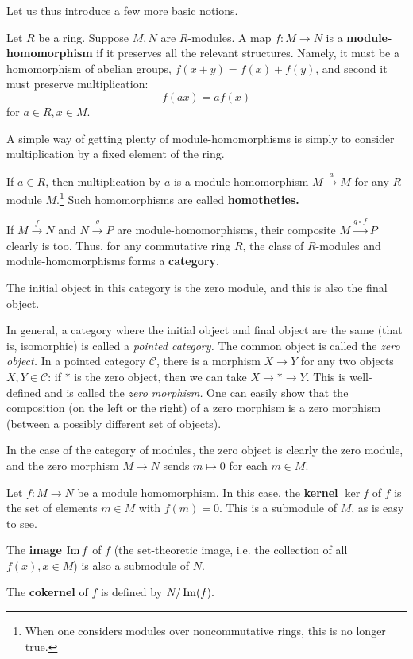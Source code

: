 Let us thus  introduce a  few more basic notions.

\begin{definition} 
Let $R$ be a ring.  Suppose $M,N$ are $R$-modules.  A map $f: M \to N$
is a \textbf{module-homomorphism} if it preserves all the relevant structures.
Namely, it must be a homomorphism of abelian groups, $f(x+y) = f(x) + f(y)$,
and second it must
preserve multiplication:
$$f(ax)  = af(x)$$ for $a \in R, x \in M$. 
\end{definition}

A simple way of getting plenty of module-homomorphisms is simply to consider
multiplication by a fixed element of the ring. 
\begin{example} 
If $a \in R$, then multiplication by $a$ is a module-homomorphism $M
\stackrel{a}{\to} M$ for any $R$-module $M$.\footnote{When one considers
modules over noncommutative rings, this is no longer true.} Such homomorphisms
are called \textbf{homotheties.}
\end{example} 


If $M \stackrel{f}{\to} N$ and $N \stackrel{g}{\to} P$ are
module-homomorphisms, their composite $M \stackrel{g \circ f}{\to} P$ clearly
is too. 
Thus, for any commutative ring $R$, the class of $R$-modules and
module-homomorphisms forms a \textbf{category}.

\begin{exercise} 
The initial object in this category is the zero module, and this is also the
final object.

In general, a category where the initial object and final object are the same
(that is, isomorphic) is called a \emph{pointed category.} The common object
is called the \emph{zero object.} In a pointed category $\mathcal{C}$, there is a morphism
$X \to Y$ for any two objects $X, Y \in \mathcal{C}$: if $\ast$ is the zero
object, then we can take $X \to \ast \to Y$. This is well-defined and is
called the \emph{zero morphism.}
One can easily show that the composition (on the left or the right) of a
zero morphism is a zero morphism (between a possibly different set of objects). 

In the case of the category of modules, the zero object is clearly the zero
module, and the zero morphism $M \to N$ sends $m \mapsto 0$ for each $m \in M$.
\end{exercise} 
\begin{definition} Let $f: M \to N$ be a module homomorphism.
In this case, the \textbf{kernel} $\ker f$ of $f$ is  the set of elements $m
\in M$ with $f(m)=0$. This is
a submodule of $M$, as is easy to see. 

The \textbf{image} $\operatorname{Im} f$ of $f$ (the set-theoretic
image, i.e. the collection of all $f(x), x \in M$) is also a submodule of $N$. 

The
\textbf{cokernel} of $f$ is defined by
\(  N/\operatorname{Im}(f).  \) 
\end{definition}

